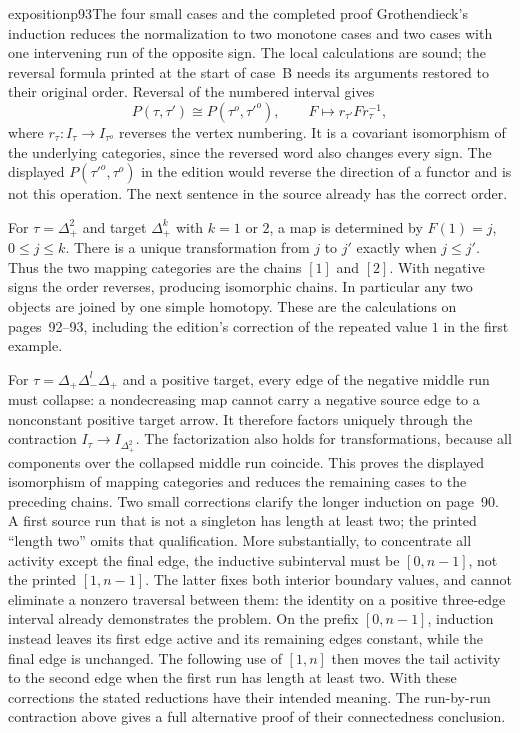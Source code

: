\begin{dcomment}{exposition}{p93}{The four small cases and the completed proof}
Grothendieck's induction reduces the normalization to two monotone cases and two cases with one intervening run of the opposite sign. The local calculations are sound; the reversal formula printed at the start of case~B needs its arguments restored to their original order. Reversal of the numbered interval gives
\[
 P(\tau,\tau')\cong P(\tau^o,\tau'^o),
 \qquad F\longmapsto r_{\tau'}F r_\tau^{-1},
\]
where $r_\tau:I_\tau\to I_{\tau^o}$ reverses the vertex numbering. It is a covariant isomorphism of the underlying categories, since the reversed word also changes every sign. The displayed $P(\tau'^o,\tau^o)$ in the edition would reverse the direction of a functor and is not this operation. The next sentence in the source already has the correct order.

For $\tau=\Delta_+^2$ and target $\Delta_+^k$ with $k=1$ or $2$, a map is determined by $F(1)=j$, $0\leq j\leq k$. There is a unique transformation from $j$ to $j'$ exactly when $j\leq j'$. Thus the two mapping categories are the chains $[1]$ and $[2]$. With negative signs the order reverses, producing isomorphic chains. In particular any two objects are joined by one simple homotopy. These are the calculations on pages~92--93, including the edition's correction of the repeated value $1$ in the first example.

For $\tau=\Delta_+\Delta_-^l\Delta_+$ and a positive target, every edge of the negative middle run must collapse: a nondecreasing map cannot carry a negative source edge to a nonconstant positive target arrow. It therefore factors uniquely through the contraction $I_\tau\to I_{\Delta_+^2}$. The factorization also holds for transformations, because all components over the collapsed middle run coincide. This proves the displayed isomorphism of mapping categories and reduces the remaining cases to the preceding chains. Two small corrections clarify the longer induction on page~90. A first source run that is not a singleton has length at least two; the printed ``length two'' omits that qualification. More substantially, to concentrate all activity except the final edge, the inductive subinterval must be $[0,n-1]$, not the printed $[1,n-1]$. The latter fixes both interior boundary values, and cannot eliminate a nonzero traversal between them: the identity on a positive three-edge interval already demonstrates the problem. On the prefix $[0,n-1]$, induction instead leaves its first edge active and its remaining edges constant, while the final edge is unchanged. The following use of $[1,n]$ then moves the tail activity to the second edge when the first run has length at least two. With these corrections the stated reductions have their intended meaning. The run-by-run contraction above gives a full alternative proof of their connectedness conclusion.
\end{dcomment}

